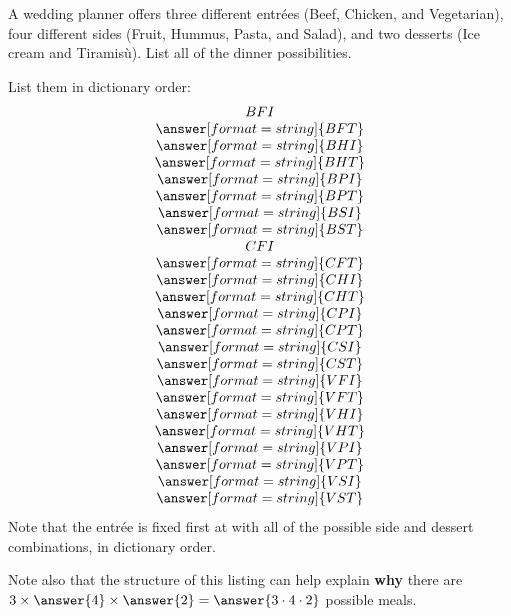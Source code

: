 \documentclass[nooutcomes]{ximera}
\begin{document}
\begin{problem}
A wedding planner offers three different entr\'ees (Beef, Chicken, and Vegetarian), four different sides (Fruit, Hummus, Pasta, and Salad), and two desserts (Ice cream and Tiramis\`u).  List all of the dinner possibilities.  

\begin{solution}
List them in dictionary order: 
\[
\begin{array}{c}
BFI \\
\answer[format=string]{BFT} \\
\answer[format=string]{BHI} \\
\answer[format=string]{BHT} \\
\answer[format=string]{BPI} \\
\answer[format=string]{BPT} \\
\answer[format=string]{BSI} \\
\answer[format=string]{BST} \\
CFI \\
\answer[format=string]{CFT} \\
\answer[format=string]{CHI} \\
\answer[format=string]{CHT} \\
\answer[format=string]{CPI} \\
\answer[format=string]{CPT} \\
\answer[format=string]{CSI} \\
\answer[format=string]{CST} \\
\answer[format=string]{VFI} \\
\answer[format=string]{VFT} \\
\answer[format=string]{VHI} \\
\answer[format=string]{VHT} \\
\answer[format=string]{VPI} \\
\answer[format=string]{VPT} \\
\answer[format=string]{VSI} \\
\answer[format=string]{VST} 
\end{array}
\]
Note that the entr\'ee is fixed first at  with all of the possible side and dessert combinations, in dictionary order.  

Note also that the structure of this listing can help explain \textbf{why} there are 
$3\times\answer{4}\times\answer{2}=\answer{3\cdot 4\cdot 2}$ possible meals.  

\end{solution}
\end{problem}
\end{document}
